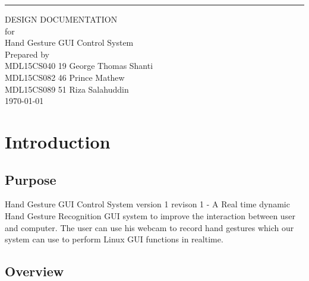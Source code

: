 \documentclass{scrreprt}
\date{}
\begin{document}
\begin{flushright}
    \rule{16cm}{5pt}\vskip1cm
    \begin{bfseries}
        \Huge{DESIGN DOCUMENTATION}\\
        \vspace{1.9cm}
        for\\
        \vspace{1.9cm}
        Hand Gesture GUI Control System\\
        \vspace{1.9cm}
        \LARGE
        Prepared by \\MDL15CS040 19 George Thomas Shanti
        \\MDL15CS082 46 Prince Mathew
        \\MDL15CS089 51 Riza Salahuddin\\
        \vspace{1.9cm}
        \today\\
    \end{bfseries}
\end{flushright}

\tableofcontents

\newpage
\chapter{Introduction}
\section{Purpose}
Hand Gesture GUI Control System version 1 revison 1 - A Real time dynamic Hand Gesture Recognition GUI system to improve the interaction between user and computer. The user can use his webcam to record hand gestures which our system can use to perform Linux GUI functions in realtime.

\section{Overview}
\end{document}
